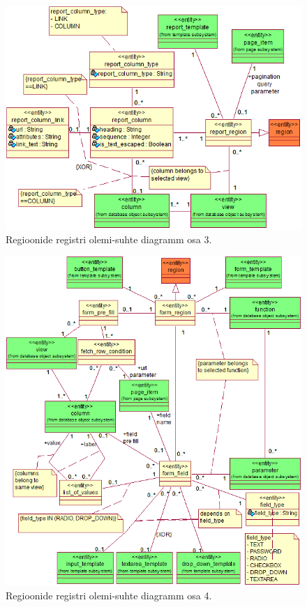 \documentclass[a4paper,12pt]{article} %
\begin{document}
\begin{figure}[H]
\centering
\includegraphics[width=\textwidth]{./diagrams/report-region-er-diagram.png}
\caption{Regioonide registri olemi-suhte diagramm osa 3.}
\label{fig_raportite_regioonide_registri_olemi_suhte_diagramm}
\end{figure}

\begin{figure}[H]
\centering
\includegraphics[width=\textwidth]{./diagrams/form-region-er-diagram.png}
\caption{Regioonide registri olemi-suhte diagramm osa 4.}
\label{fig_vormide_regioonide_registri_olemi_suhte_diagramm}
\end{figure}
\end{document}
